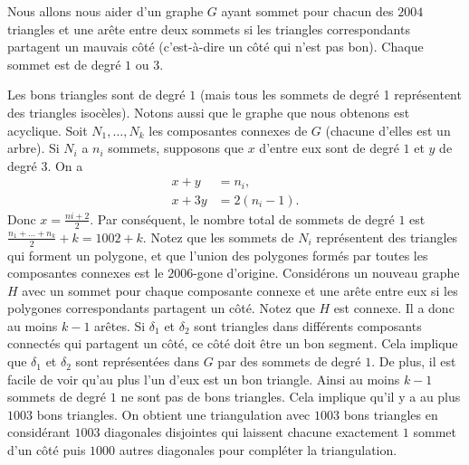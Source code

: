 \begin{sol}
Nous allons nous aider d’un graphe $G$ ayant sommet pour chacun des $2004$ triangles et une arête entre deux sommets si les triangles correspondants partagent un mauvais côté (c'est-à-dire un côté qui n’est pas bon).
Chaque sommet est de degré $1$ ou $3$.

Les bons triangles sont de degré $1$ (mais tous les sommets de degré 1 représentent des triangles isocèles). Notons aussi que le graphe que nous obtenons est acyclique. Soit $N_1, \dots, N_k$ les composantes connexes de $G$ (chacune d'elles est un arbre). Si $N_i $ a $n_i$ sommets, supposons que $x$ d’entre eux sont de degré $1$ et $y$ de degré $3$. On a
\begin{align*}
x +y &= n_i ,\\
x +3y &= 2(n_i - 1).
\end{align*}
Donc $x = \frac{ni + 2}{2}$. Par conséquent, le nombre total de sommets de degré $1$ est $\frac{n_1 + \dots + n_k}{2} + k = 1002 + k$. Notez que les sommets de $N_i$ représentent des triangles qui forment un polygone, et que l'union des polygones formés par toutes les composantes connexes est le $2006$-gone d’origine. Considérons un nouveau graphe $H $ avec un sommet pour chaque composante connexe et une arête entre eux si les polygones correspondants partagent un côté. Notez que $H $ est connexe. Il a donc au moins $k - 1$ arêtes. Si $\delta_1$ et $\delta_2$ sont triangles dans différents composants connectés qui partagent un côté, ce côté doit être un bon segment. Cela implique que $\delta_1$ et $\delta_2$ sont représentées dans $G$ par des sommets de degré $1$. De plus, il est facile de voir qu'au plus l'un d'eux est un bon triangle. Ainsi au moins $k - 1$ sommets de degré $1$ ne sont pas de bons triangles. Cela implique qu'il y a au plus $1003$ bons triangles. On obtient une triangulation avec $1003$ bons triangles en considérant $1003$ diagonales disjointes qui laissent chacune exactement $1$ sommet d'un côté puis $1000$ autres diagonales pour compléter la triangulation.
\end{sol}


